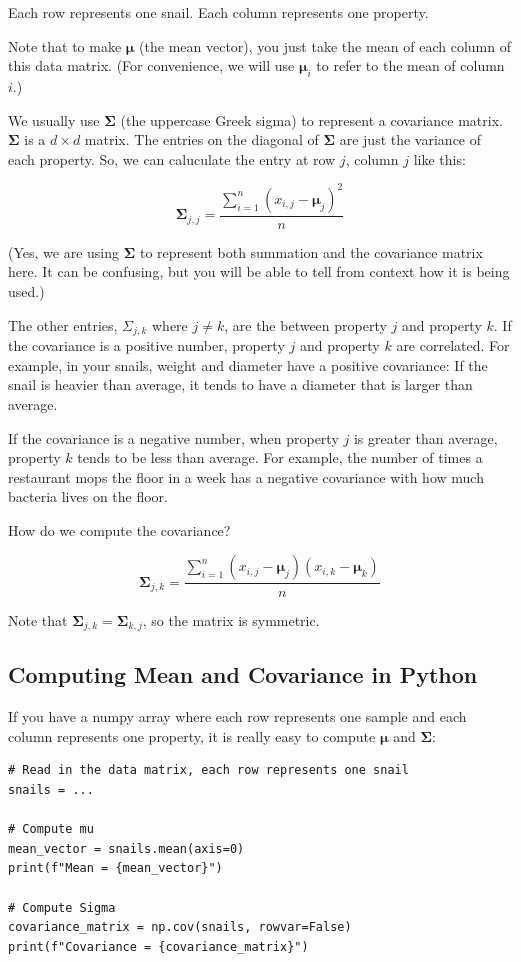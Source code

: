 Each row represents one snail. Each column represents one property.

Note that to make $\boldsymbol\mu$ (the mean vector), you just take the mean of each column of this data matrix. (For convenience, we will use $\boldsymbol\mu_i$ to refer to the mean of column $i$.)

We usually use $\mathbf{\Sigma}$ (the uppercase Greek sigma) to represent a covariance matrix. $\mathbf{\Sigma}$ is a $d \times d$ matrix.
The entries on the diagonal of $\mathbf{\Sigma}$ are just the variance of each property.
So, we can caluculate the entry at row $j$, column $j$ like this:

$$\mathbf{\Sigma}_{j,j} = \frac{\sum_{i=1}^{n}(x_{i,j} - \boldsymbol\mu_j)^2}{n}$$

(Yes, we are using $\mathbf{\Sigma}$ to represent both summation and the covariance matrix here.
It can be confusing, but you will be able to tell from context how it is being used.)

The other entries, $\Sigma_{j,k}$ where $j \neq k$, are the  between property $j$ and property $k$.
If the covariance is a positive number, property $j$ and property $k$ are correlated. For example, in your snails, weight and diameter have a positive covariance: If the snail is heavier than average, it tends to have a diameter that is larger than average.

If the covariance is a negative number, when property $j$ is greater than average, property $k$ tends to be less than average.
For example, the number of times a restaurant mops the floor in a week has a negative covariance with how much bacteria lives on the floor.

How do we compute the covariance?

$$\mathbf{\Sigma}_{j,k} = \frac{\sum_{i=1}^{n}(x_{i,j} - \boldsymbol\mu_j)(x_{i,k} - \boldsymbol\mu_k)}{n}$$

Note that $\mathbf{\Sigma}_{j,k} = \mathbf{\Sigma}_{k,j}$, so the matrix is symmetric.

\subsection{Computing Mean and Covariance in Python}

If you have a numpy array where each row represents one sample and each column represents one property, it is really easy to compute $\boldsymbol\mu$ and $\mathbf{\Sigma}$:

\begin{verbatim}
# Read in the data matrix, each row represents one snail
snails = ...

# Compute mu
mean_vector = snails.mean(axis=0)
print(f"Mean = {mean_vector}")

# Compute Sigma
covariance_matrix = np.cov(snails, rowvar=False)
print(f"Covariance = {covariance_matrix}")
\end{verbatim}

